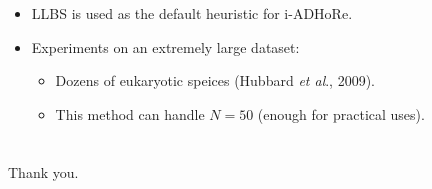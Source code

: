 \documentclass[xcolor=dvipsnames,envcountsect,handout]{beamer}
\begin{document}
\begin{frame}
\frametitle{}
\begin{itemize}
\item LLBS is used as the default heuristic for i-ADHoRe. 
\vspace{8pt}
\item Experiments on an extremely large dataset: 
\begin{itemize}
\item Dozens of eukaryotic speices (Hubbard {\it et al}., 2009). 
\vspace{4pt}
\item This method can handle $N = 50$ (enough for practical uses). 
\end{itemize}
\end{itemize}
\end{frame}






\section*{}


\begin{frame}
\frametitle{}
\begin{center}
{\Huge Thank you.}
\end{center}
\end{frame}
\end{document}
